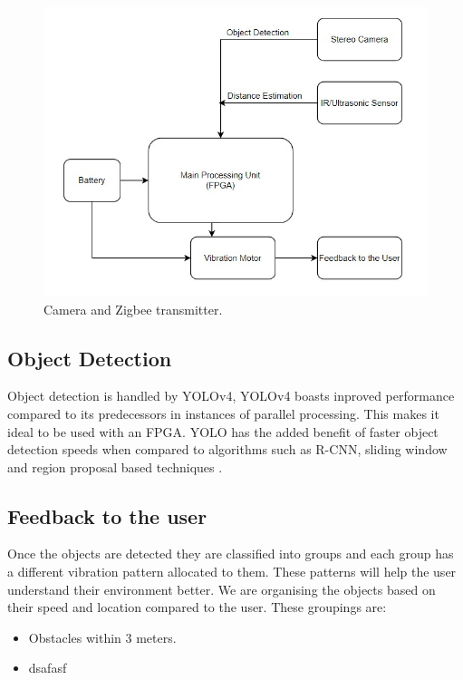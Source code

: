 \documentclass[conference]{IEEEtran}
\begin{document}
\begin{figure}[htbp]
\centerline{\includegraphics[scale=0.4]{blockdiagram.jpeg}}
\caption{Camera and Zigbee transmitter.}
\label{fig}
\end{figure}

\subsection{Object Detection}\label{AA}
Object detection is handled by YOLOv4, YOLOv4 boasts inproved performance compared to its predecessors in instances of parallel processing. This makes it ideal to be used with an FPGA. YOLO has the added benefit of faster object detection speeds when compared to algorithms such as R-CNN, sliding window and region proposal based techniques \cite{yolo}. 

\subsection{Feedback to the user}
Once the objects are detected they are classified into groups and each group has a different vibration pattern allocated to them. These patterns will help the user understand their environment better. We are organising the objects based on their speed and location compared to the user. These groupings are:
\begin{itemize}
\item Obstacles within 3 meters.
\item dsafasf
\end{itemize}


{}

\end{document}
